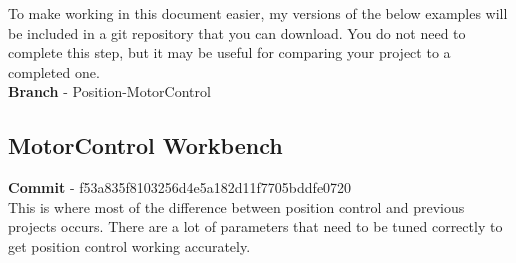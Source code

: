 \documentclass[10pt]{article}
\begin{document}
            To make working in this document easier, my versions of the below examples will be included in a git repository that you can download. You do not need to complete this step, but it may be useful for comparing your project to a completed one. \\
            \textbf{Branch} - Position-MotorControl
		\FloatBarrier \subsection{MotorControl Workbench}
            \textbf{Commit} - f53a835f8103256d4e5a182d11f7705bddfe0720 \\
            This is where most of the difference between position control and previous projects occurs. There are a lot of parameters that need to be tuned correctly to get position control working accurately.
\end{document}
